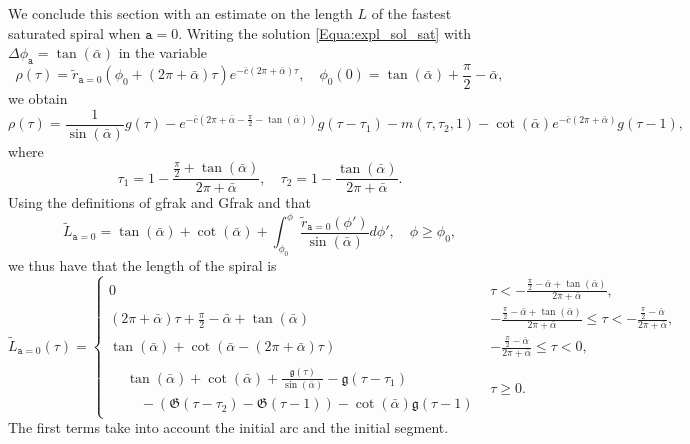 \documentclass[reqno]{amsart}
\theoremstyle{definition} \newtheorem{definition}{Definition}[section]
\theoremstyle{definition} \newtheorem{remark}[definition]{Remark}
\theoremstyle{plain} \newtheorem{lemma}[definition]{Lemma}
\theoremstyle{plain} \newtheorem{proposition}[definition]{Proposition}
\theoremstyle{plain} \newtheorem{theorem}[definition]{Theorem}
\theoremstyle{plain} \newtheorem{corollary}[definition]{Corollary}
\theoremstyle{definition} \newtheorem{example}[definition]{Example}
\theoremstyle{plain} \newtheorem{claim}[clai]{Claim}
\theoremstyle{definition} \newtheorem{assumption}[definition]{Assumption}
\theoremstyle{definition} \newtheorem{observation}[definition]{Observation}
\newcommand{\1}{\mathbbm 1}
\numberwithin{equation}{section} %
\theoremstyle{plain} \newtheorem*{theorem*}{Theorem}
\theoremstyle{plain} \newtheorem{mthm}[maintheorem]{Main Theorem}
\theoremstyle{plain} \newtheorem*{mthm*}{Main Theorem}
\theoremstyle{plain} \newtheorem*{conjecture*}{Conjecture}
\theoremstyle{plain} \newtheorem{conjecture}[definition]{Conjecture}
\theoremstyle{plain} \newtheorem*{problem*}{Problem}
\begin{document}
We conclude this section with an estimate on the length $L$ of the fastest saturated spiral when $\mathtt a = 0$. Writing the solution \eqref{Equa:expl_sol_sat} with $\Delta \phi_\mathtt a = \tan(\bar \alpha)$ in the variable
\begin{equation*}
\rho(\tau) = \tilde r_{\mathtt a = 0}(\phi_0 + (2\pi + \bar \alpha) \tau) e^{- \bar c (2\pi + \bar \alpha) \tau}, \quad \phi_0(0) = \tan(\bar \alpha) + \frac{\pi}{2} - \bar \alpha,
\end{equation*}
we obtain
\begin{equation}
\label{Equa:rhobase_01}
\rho(\tau) = \frac{1}{\sin(\bar \alpha)} g(\tau) - e^{-\bar c(2\pi + \bar \alpha - \frac{\pi}{2} - \tan(\bar \alpha))} g(\tau - \tau_1) - m(\tau,\tau_2,1) - \cot(\bar \alpha) e^{-\bar c(2\pi + \bar \alpha)} g(\tau - 1),
\end{equation}
where
\begin{equation*}
\tau_1 = 1 - \frac{\frac{\pi}{2} + \tan(\bar \alpha)}{2\pi + \bar \alpha}, \quad \tau_2 = 1 - \frac{\tan(\bar \alpha)}{2\pi + \bar \alpha}.
\end{equation*}
Using the definitions of \gls{gfrak} and \gls{Gfrak} and that
$$
\tilde L_{\mathtt a = 0} = \tan(\bar \alpha) + \cot(\bar \alpha) + \int_{\phi_0}^\phi \frac{\tilde r_{\mathtt a=0}(\phi')}{\sin(\bar \alpha)} d\phi', \quad \phi \geq \phi_0,
$$
we thus have that the length of the spiral is
\begin{equation}
\label{Equa:Lbase_01}
\tilde L_{\mathtt a = 0}(\tau) = \begin{cases}
0 & \tau < - \frac{\frac{\pi}{2} - \bar \alpha + \tan(\bar \alpha)}{2\pi + \bar \alpha}, \\
(2\pi + \bar \alpha) \tau + \frac{\pi}{2} - \bar \alpha + \tan(\bar \alpha) & - \frac{\frac{\pi}{2} - \bar \alpha + \tan(\bar \alpha)}{2\pi + \bar \alpha} \leq \tau < - \frac{\frac{\pi}{2} - \bar \alpha}{2\pi + \bar \alpha}, \\
\tan(\bar \alpha) + \cot(\bar \alpha - (2\pi + \bar \alpha) \tau) & - \frac{\frac{\pi}{2} - \bar \alpha}{2\pi + \bar \alpha} \leq \tau < 0, \\
\begin{aligned}
&\tan(\bar \alpha) + \cot(\bar \alpha) + \frac{\mathfrak g(\tau)}{\sin(\bar \alpha)} - \mathfrak g(\tau - \tau_1) \\
& \quad - (\mathfrak G(\tau - \tau_2) - \mathfrak G(\tau - 1)) - \cot(\bar \alpha) \mathfrak g(\tau - 1)
\end{aligned} & \tau \geq 0.
\end{cases}
\end{equation}
The first terms take into account the initial arc and the initial segment.
\end{document}
